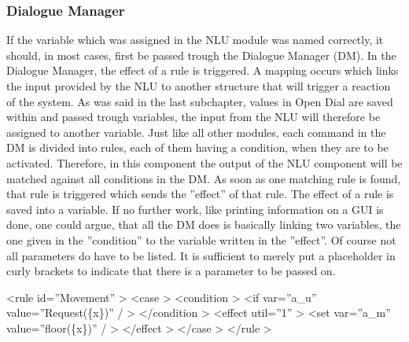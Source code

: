 \subsubsection{Dialogue Manager}

If the variable which was assigned in the NLU module was named correctly, it should, in most cases, first be passed trough the Dialogue Manager (DM).
In the Dialogue Manager, the effect of a rule is triggered. A mapping occurs which links the input provided by the NLU to another structure that will trigger a reaction of the system.
As was said in the last subchapter, values in Open Dial are saved within and passed trough variables, the input from the NLU will therefore be assigned to another variable. \newline
Just like all other modules, each command in the DM is divided into rules, each of them having a condition, when they are to be activated. 
Therefore, in this component the output of the NLU component will be matched against all conditions in the DM. 
As soon as one matching rule is found, that rule is triggered which sends the ”effect” of that rule.
The effect of a rule is saved into a variable.
If no further work, like printing information on a GUI is done, one could argue, that all the DM does is basically linking two variables, the one given in the ”condition” to the variable written in the ”effect”.
Of course not all parameters do have to be listed.
It is sufficient to merely put a placeholder in curly brackets to indicate that there is a parameter to be passed on. \newline


\textless rule id=”Movement” \textgreater \newline
 \indent \indent \textless case \textgreater \newline
\indent \indent \indent \textless condition \textgreater \newline
\indent \indent \indent \indent \textless if var=”a\_u” value=”Request(\{x\})” / \textgreater \newline
 \indent \indent \indent \textless /condition \textgreater \newline
 \indent \indent \indent \textless effect util=”1” \textgreater \newline 
 \indent \indent \indent \indent \textless set var=”a\_m” value=”floor(\{x\})” / \textgreater \newline
 \indent \indent \indent \textless /effect \textgreater \newline
\indent \indent \textless /case \textgreater \newline
\indent \textless /rule \textgreater \newline

